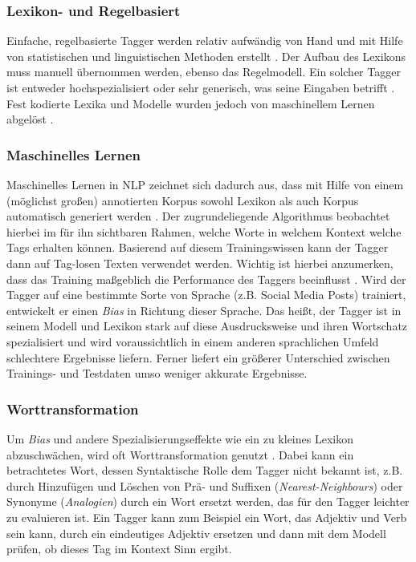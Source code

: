 \subsubsection{Lexikon- und Regelbasiert}

Einfache, regelbasierte Tagger werden relativ aufwändig von Hand und mit Hilfe von statistischen und linguistischen Methoden erstellt \cite{halteren}. Der Aufbau des Lexikons muss manuell übernommen werden, ebenso das Regelmodell. Ein solcher Tagger ist entweder hochspezialisiert oder sehr generisch, was seine Eingaben betrifft \cite{Eynde}. Fest kodierte Lexika und Modelle wurden jedoch von maschinellem Lernen abgelöst \cite{Smith}.

\subsubsection{Maschinelles Lernen}

Maschinelles Lernen in NLP zeichnet sich dadurch aus, dass mit Hilfe von einem (möglichst großen) annotierten Korpus sowohl Lexikon als auch Korpus automatisch generiert werden \cite{halteren}. Der zugrundeliegende Algorithmus beobachtet hierbei im für ihn sichtbaren Rahmen, welche Worte in welchem Kontext welche Tags erhalten können. Basierend auf diesem Trainingswissen kann der Tagger dann auf Tag-losen Texten verwendet werden. Wichtig ist hierbei anzumerken, dass das Training maßgeblich die Performance des Taggers beeinflusst \cite{Smith} \cite{Sorgaard}. Wird der Tagger auf eine bestimmte Sorte von Sprache (z.B. Social Media Posts) trainiert, entwickelt er einen \textit{Bias} in Richtung dieser Sprache. Das heißt, der Tagger ist in seinem Modell und Lexikon stark auf diese Ausdrucksweise und ihren Wortschatz spezialisiert und wird voraussichtlich in einem anderen sprachlichen Umfeld schlechtere Ergebnisse liefern. Ferner liefert ein größerer Unterschied zwischen Trainings- und Testdaten umso weniger akkurate Ergebnisse.

\subsubsection{Worttransformation}

Um \textit{Bias} und andere Spezialisierungseffekte wie ein zu kleines Lexikon abzuschwächen, wird oft Worttransformation genutzt \cite{Sorgaard} \cite{Jones}. Dabei kann ein betrachtetes Wort, dessen Syntaktische Rolle dem Tagger nicht bekannt ist, z.B. durch Hinzufügen und Löschen von Prä- und Suffixen (\textit{Nearest-Neighbours}) oder Synonyme (\textit{Analogien}) durch ein Wort ersetzt werden, das für den Tagger leichter zu evaluieren ist. Ein Tagger kann zum Beispiel ein Wort, das Adjektiv und Verb sein kann, durch ein eindeutiges Adjektiv ersetzen und dann mit dem Modell prüfen, ob dieses Tag im Kontext Sinn ergibt.

